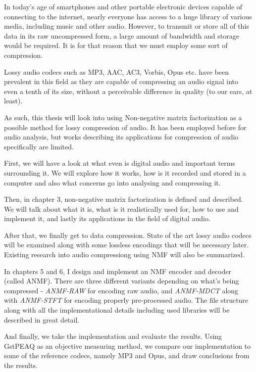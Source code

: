 In today's age of smartphones and other portable electronic devices capable of connecting to the internet, nearly everyone has access to a huge library of various media, including music and other audio. However, to transmit or store all of this data in its raw uncompressed form, a large amount of bandwidth and storage would be required. It is for that reason that we must employ some sort of compression.

Lossy audio codecs such as MP3, AAC, AC3, Vorbis, Opus etc. have been prevalent in this field as they are capable of compressing an audio signal into even a tenth of its size, without a perceivable difference in quality (to our ears, at least).

As such, this thesis will look into using Non-negative matrix factorization as a possible method for lossy compression of audio. It has been employed before for audio analysis, but works describing its applications for compression of audio specifically are limited.

First, we will have a look at what even is digital audio and important terms surrounding it. We will explore how it works, how is it recorded and stored in a computer and also what concerns go into analysing and compressing it.

Then, in chapter 3, non-negative matrix factorization is defined and described. We will talk about what it is, what is it realistically used for, how to use and implement it, and lastly its applications in the field of digital audio.

After that, we finally get to data compression. State of the art lossy audio codecs will be examined along with some lossless encodings that will be necessary later. Existing research into audio compressiong using NMF will also be summarized.

In chapters 5 and 6, I design and implement an NMF encoder and decoder (called ANMF). There are three different variants depending on what's being compressed - \emph{ANMF-RAW} for encoding raw audio, and \emph{ANMF-MDCT} along with \emph{ANMF-STFT} for encoding properly pre-processed audio. The file structure along with all the implementational details including used libraries will be described in great detail.

And finally, we take the implementation and evaluate the results. Using GstPEAQ as an objective measuring method, we compare our implementation to some of the reference codecs, namely MP3 and Opus, and draw conclusions from the results.
